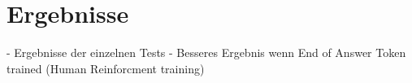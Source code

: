 \chapter{Ergebnisse}\label{ch:results}

- Ergebnisse der einzelnen Tests
- Besseres Ergebnis wenn End of Answer Token trained (Human Reinforcment training)